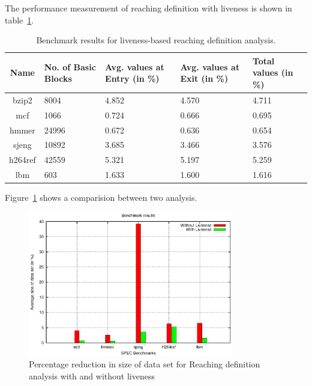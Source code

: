 \documentclass[11pt,a4paper,openright]{report}
\begin{document}
The performance measurement of reaching definition with liveness is shown in table~\ref{tab:performance_with_l}.
\begin{table}[H]
  \begin{center}
    \begin{tabular}{|c|p{1.5cm}|p{2cm}|p{2cm}|p{2cm}|}
    \hline
      Name & No. of Basic Blocks & Avg. values at Entry (in \%) & Avg. values at Exit (in \%) & Total values (in \%)\\
      \hline
   	  bzip2 & 8004 & 4.852 & 4.570 & 4.711 \\ \hline
   	  mcf & 1066 & 0.724 & 0.666 & 0.695 \\ \hline
   	  hmmer & 24996 & 0.672 & 0.636  & 0.654 \\ \hline
   	  sjeng & 10892 & 3.685 & 3.466 & 3.576 \\ \hline
   	  h264ref & 42559 & 5.321 & 5.197 & 5.259\\ \hline
   	  lbm & 603 & 1.633 & 1.600 & 1.616\\ \hline
   	  
	\hline
    \end{tabular}
    \caption{Benchmark results for liveness-based reaching definition analysis.}
      \label{tab:performance_with_l}
  \end{center}
\end{table}


Figure~\ref{fig:bench_mark} shows a comparision between two analysis.
\begin{figure}[p]
\centering
\includegraphics[width=0.8\textwidth]{graph.eps}
\caption{Percentage reduction in size of data set for Reaching definition analysis with and without liveness}
\label{fig:bench_mark}
\end{figure}
\end{document}
